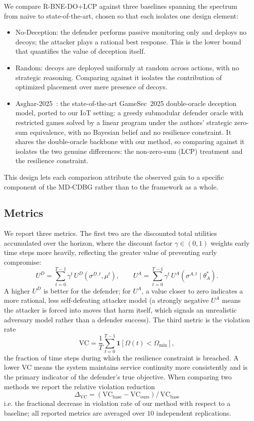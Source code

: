 \documentclass[conference]{IEEEtran}
\newcommand{\indic}{\mathbf{1}}
\begin{document}
We compare R-BNE-DO+LCP against three baselines spanning the spectrum from
naive to state-of-the-art, chosen so that each isolates one design element:
\begin{itemize}
\item No-Deception: the defender performs passive monitoring only and
deploys no decoys; the attacker plays a rational best response. This is the
lower bound that quantifies the value of deception itself.
\item Random: decoys are deployed uniformly at random across actions,
with no strategic reasoning. Comparing against it isolates the contribution of
optimized placement over mere presence of decoys.
\item Asghar-2025~\cite{asghar2025}: the state-of-the-art GameSec~2025
double-oracle deception model, ported to our IoT setting: a greedy submodular
defender oracle with restricted games solved by a linear program under the
authors' strategic zero-sum equivalence, with no Bayesian belief and no
resilience constraint. It shares the double-oracle backbone with our method, so
comparing against it isolates the two genuine differences: the non-zero-sum
(LCP) treatment and the resilience constraint.
\end{itemize}
This design lets each comparison attribute the observed gain to a specific
component of the MD-CDBG rather than to the framework as a whole.

\subsection{Metrics}

We report three metrics. The first two are the discounted total
utilities accumulated over the horizon, where the discount factor
$\gamma\in(0,1)$ weights early time steps more heavily, reflecting the greater
value of preventing early compromise:
\begin{equation}
U^D = \sum_{t=0}^{T-1}\gamma^t\,U^D(\sigma^{D,t},\mu^t),
\qquad
U^A = \sum_{t=0}^{T-1}\gamma^t\,U^A(\sigma^{A,t}\mid\theta_A^*).
\label{eq:discounted}
\end{equation}
A higher $U^D$ is better for the defender; for $U^A$, a value closer to zero
indicates a more rational, less self-defeating attacker model (a strongly
negative $U^A$ means the attacker is forced into moves that harm itself, which
signals an unrealistic adversary model rather than a defender success). The
third metric is the violation rate
\begin{equation}
\mathrm{VC} = \frac{1}{T}\sum_{t=0}^{T-1}\indic\!\left[\Omega(t)<\Omega_{\min}
\right],
\label{eq:vc}
\end{equation}
the fraction of time steps during which the resilience constraint is breached.
A lower VC means the system maintains service continuity more consistently and
is the primary indicator of the defender's true objective. When comparing two
methods we report the relative violation reduction
$$\Delta_{\mathrm{VC}} = (\mathrm{VC}_{\text{base}}-\mathrm{VC}_{\text{ours}})
/\,\mathrm{VC}_{\text{base}}$$ i.e. the fractional decrease in violation rate of
our method with respect to a baseline; all reported metrics are averaged over
$10$ independent replications.
\end{document}
